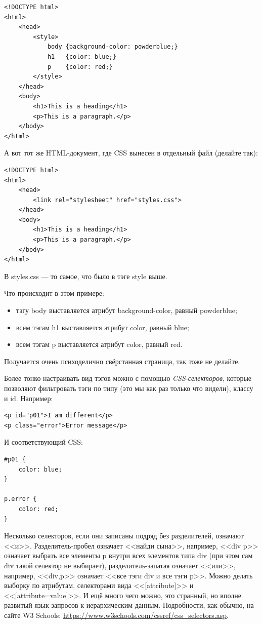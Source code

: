 \documentclass[a5paper]{article}
\begin{document}
\begin{verbatim}
<!DOCTYPE html>
<html>
    <head>
        <style>
            body {background-color: powderblue;}
            h1   {color: blue;}
            p    {color: red;}
        </style>
    </head>
    <body>
        <h1>This is a heading</h1>
        <p>This is a paragraph.</p>
    </body>
</html>
\end{verbatim}

А вот тот же HTML-документ, где CSS вынесен в отдельный файл (делайте так):

\begin{verbatim}
<!DOCTYPE html>
<html>
    <head>
        <link rel="stylesheet" href="styles.css">
    </head>
    <body>
        <h1>This is a heading</h1>
        <p>This is a paragraph.</p>
    </body>
</html>
\end{verbatim}

В styles.css --- то самое, что было в тэге style выше.

Что происходит в этом примере:

\begin{itemize}
    \item тэгу body выставляется атрибут background-color, равный powderblue;
    \item всем тэгам h1 выставляется атрибут color, равный blue;
    \item всем тэгам p выставляется атрибут color, равный red.
\end{itemize}

Получается очень психоделично свёрстанная страница, так тоже не делайте.

Более тонко настраивать вид тэгов можно с помощью \emph{CSS-селекторов}, которые позволяют фильтровать тэги по типу (это мы как раз только что видели), классу и id. Например:

\begin{verbatim}
<p id="p01">I am different</p>
<p class="error">Error message</p>
\end{verbatim}

И соответствующий CSS:

\begin{verbatim}
#p01 {
    color: blue;
}

p.error {
    color: red;
}
\end{verbatim}

Несколько селекторов, если они записаны подряд без разделителей, означают <<и>>. Разделитель-пробел означает <<найди сына>>, например, <<div p>> означает выбрать все элементы p внутри всех элементов типа div (при этом сам div такой селектор не выбирает), разделитель-запатая означает <<или>>, например, <<div,p>> означает <<все тэги div и все тэги p>>. Можно делать выборку по атрибутам, селекторами вида <<[attribute]>> и <<[attribute=value]>>. И ещё много чего можно, это странный, но вполне развитый язык запросов к иерархическим данным. Подробности, как обычно, на сайте W3 Schools: \url{https://www.w3schools.com/cssref/css_selectors.asp}.
\end{document}
